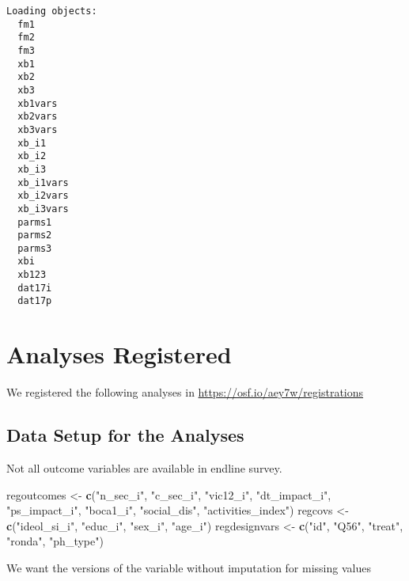 \documentclass[11pt,]{article}
\newenvironment{Shaded}{\begin{snugshade}}{\end{snugshade}}
\newcommand{\KeywordTok}[1]{\textcolor[rgb]{0.13,0.29,0.53}{\textbf{#1}}}
\newcommand{\NormalTok}[1]{#1}
\newcommand{\StringTok}[1]{\textcolor[rgb]{0.31,0.60,0.02}{#1}}
\begin{document}
\begin{verbatim}
Loading objects:
  fm1
  fm2
  fm3
  xb1
  xb2
  xb3
  xb1vars
  xb2vars
  xb3vars
  xb_i1
  xb_i2
  xb_i3
  xb_i1vars
  xb_i2vars
  xb_i3vars
  parms1
  parms2
  parms3
  xbi
  xb123
  dat17i
  dat17p
\end{verbatim}

\normalsize

\hypertarget{analyses-registered}{%
\section{Analyses Registered}\label{analyses-registered}}

We registered the following analyses in
\url{https://osf.io/aey7w/registrations}

\hypertarget{data-setup-for-the-analyses}{%
\subsection{Data Setup for the
Analyses}\label{data-setup-for-the-analyses}}

Not all outcome variables are available in endline survey.

\scriptsize

\begin{Shaded}
\begin{Highlighting}[]
\NormalTok{regoutcomes <-}\StringTok{ }\KeywordTok{c}\NormalTok{(}\StringTok{"n_sec_i"}\NormalTok{, }\StringTok{"c_sec_i"}\NormalTok{, }\StringTok{"vic12_i"}\NormalTok{, }\StringTok{"dt_impact_i"}\NormalTok{, }\StringTok{"ps_impact_i"}\NormalTok{, }\StringTok{"boca1_i"}\NormalTok{, }\StringTok{"social_dis"}\NormalTok{, }\StringTok{"activities_index"}\NormalTok{)}
\NormalTok{regcovs <-}\StringTok{ }\KeywordTok{c}\NormalTok{(}\StringTok{"ideol_si_i"}\NormalTok{, }\StringTok{"educ_i"}\NormalTok{, }\StringTok{"sex_i"}\NormalTok{, }\StringTok{"age_i"}\NormalTok{)}
\NormalTok{regdesignvars <-}\StringTok{ }\KeywordTok{c}\NormalTok{(}\StringTok{"id"}\NormalTok{, }\StringTok{"Q56"}\NormalTok{, }\StringTok{"treat"}\NormalTok{, }\StringTok{"ronda"}\NormalTok{, }\StringTok{"ph_type"}\NormalTok{)}
\end{Highlighting}
\end{Shaded}

\normalsize

We want the versions of the variable without imputation for missing
values

\scriptsize
\end{document}
